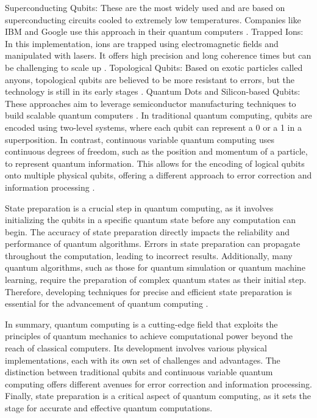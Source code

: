 \documentclass[12pt]{article}
\begin{document}
Superconducting Qubits: These are the most widely used and are based on superconducting circuits cooled to extremely low temperatures. Companies like IBM and Google use this approach in their quantum computers \cite{devoret2013superconducting}.
Trapped Ions: In this implementation, ions are trapped using electromagnetic fields and manipulated with lasers. It offers high precision and long coherence times but can be challenging to scale up \cite{blatt2012quantum}.
Topological Qubits: Based on exotic particles called anyons, topological qubits are believed to be more resistant to errors, but the technology is still in its early stages \cite{kitaev2003fault}.
Quantum Dots and Silicon-based Qubits: These approaches aim to leverage semiconductor manufacturing techniques to build scalable quantum computers \cite{loss1998quantum}.
In traditional quantum computing, qubits are encoded using two-level systems, where each qubit can represent a 0 or a 1 in a superposition. In contrast, continuous variable quantum computing uses continuous degrees of freedom, such as the position and momentum of a particle, to represent quantum information. This allows for the encoding of logical qubits onto multiple physical qubits, offering a different approach to error correction and information processing \cite{weedbrook2012gaussian}.

State preparation is a crucial step in quantum computing, as it involves initializing the qubits in a specific quantum state before any computation can begin. The accuracy of state preparation directly impacts the reliability and performance of quantum algorithms. Errors in state preparation can propagate throughout the computation, leading to incorrect results. Additionally, many quantum algorithms, such as those for quantum simulation or quantum machine learning, require the preparation of complex quantum states as their initial step. Therefore, developing techniques for precise and efficient state preparation is essential for the advancement of quantum computing \cite{nielsen2002quantum}.

In summary, quantum computing is a cutting-edge field that exploits the principles of quantum mechanics to achieve computational power beyond the reach of classical computers. Its development involves various physical implementations, each with its own set of challenges and advantages. The distinction between traditional qubits and continuous variable quantum computing offers different avenues for error correction and information processing. Finally, state preparation is a critical aspect of quantum computing, as it sets the stage for accurate and effective quantum computations.
\end{document}
